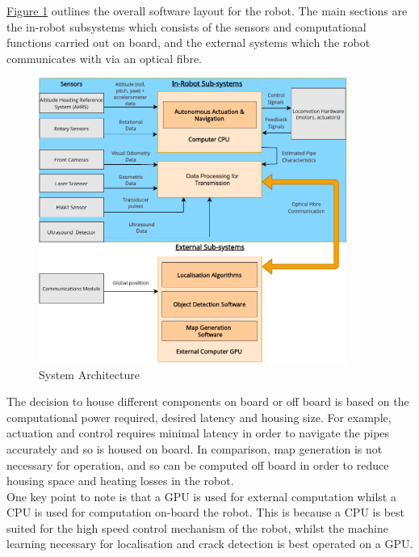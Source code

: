 \documentclass[11pt]{article}		%
\newcommand{\figref}[1]{\hyperref[#1]{Figure \ref*{#1}}}    %
\begin{document}
	         \figref{overalls} outlines the overall software layout for the robot. The main sections are the in-robot subsystems which consists of the sensors and computational functions carried out on board, and the external systems which the robot communicates with via an optical fibre. 
	         \\
    		\begin{figure}[h]
				\centering
				\includegraphics[width = 0.9\textwidth]{subsystemss}
				\caption{System Architecture}
				\label{overalls}
			\end{figure}
	         \hspace*{3ex}The decision to house different components on board or off board is based on the computational power required, desired latency and housing size. For example, actuation and control requires minimal latency in order to navigate the pipes accurately and so is housed on board. In comparison, map generation is not necessary for operation, and so can be computed off board in order to reduce housing space and heating losses in the robot. \\
	
      		\hspace*{3ex}One key point to note is that a GPU is used for external computation whilst a CPU is used for computation on-board the robot. This is because a CPU is best suited for the high speed control mechanism of the robot, whilst the machine learning necessary for localisation and crack detection is best operated on a GPU.
	          
\end{document}
